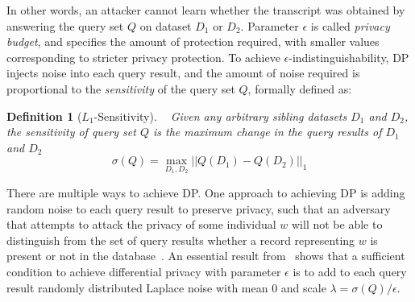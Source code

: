\documentclass{USC-Thesis}
\numberwithin{equation}{chapter}
\begin{document}
In other words, an attacker cannot learn whether the transcript was obtained by answering the query set $Q$ on dataset $D_1$ or $D_2$. Parameter $\epsilon$ is called {\em privacy budget}, and specifies the amount of protection required, with smaller values corresponding to stricter privacy protection. To achieve $\epsilon$-indistinguishability, DP injects noise into each query result, and the amount of noise required is proportional to the {\em sensitivity} of the query set $Q$, formally defined as:
\newtheorem{sensitivity}[definition]{Definition}\label{sensitivity}
\begin{sensitivity}[$L_1$-Sensitivity]~\cite{dwork2006calibrating}
Given any arbitrary sibling datasets $D_1$ and $D_2$, the sensitivity of query set $Q$ is the maximum change in the query results of $D_1$ and $D_2$
$$\sigma(Q) = \max_{D_1, D_2}||Q(D_1)-Q(D_2)||_1$$
\end{sensitivity}
There are multiple ways to achieve DP. One approach to achieving DP is adding random noise to each query result to preserve privacy, such that an adversary that attempts to attack the privacy of some individual $w$ will not be able to distinguish from the set of query results whether a record representing $w$ is present or not in the database~\cite{dwork2006calibrating}.
An essential result from~\cite{dwork2006calibrating} shows that a sufficient condition to achieve differential privacy with parameter $\epsilon$ is to add to each query result randomly distributed Laplace noise with mean 0 and scale $\lambda = \sigma(Q)/\epsilon$.

\end{document}
